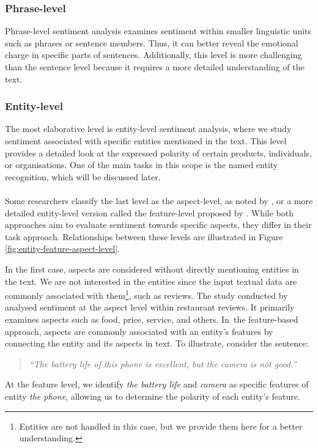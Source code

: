 \subsubsection*{Phrase-level}
\label{subsubsec:phrase-level}
Phrase-level sentiment analysis examines sentiment within smaller linguistic units such as phrases or sentence members. Thus, it can better reveal the emotional charge in specific parts of sentences. Additionally, this level is more challenging than the sentence level because it requires a more detailed understanding of the text. 

\subsubsection*{Entity-level}
\label{subsubsec:entity-level}
The most elaborative level is entity-level sentiment analysis, where we study sentiment associated with specific entities mentioned in the text. This level provides a detailed look at the expressed polarity of certain products, individuals, or organisations. One of the main tasks in this scope is the named entity recognition, which will be discussed later.

\paragraph{}

Some researchers classify the last level as the aspect-level, as noted by \cite{Wankhade2022}, or a more detailed entity-level version called the feature-level proposed by \cite{Jenifer2017}. While both approaches aim to evaluate sentiment towards specific aspects, they differ in their task approach. Relationships between these levels are illustrated in Figure \ref{fig:entity-feature-aspect-level}.

In the first case, aspects are considered without directly mentioning entities in the text. We are not interested in the entities since the input textual data are commonly associated with them\footnote{Entities are not handled in this case, but we provide them here for a better understanding.}, such as reviews. The study conducted by \cites{Wang2019} analysed sentiment at the aspect level within restaurant reviews. It primarily examines aspects such as food, price, service, and others. In~the feature-based approach, aspects are commonly associated with an entity's features by connecting the entity and its aspects in text. To illustrate, consider the sentence:\begin{quote}
    \textit{``The battery life of this phone is excellent, but the camera is not good.''}
\end{quote} At the feature level, we identify \textit{the battery life} and \textit{camera} as specific features of entity \textit{the phone}, allowing us to determine the polarity of each entity's feature.

